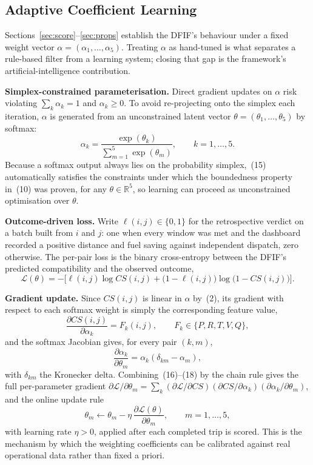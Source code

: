 \documentclass[conference]{IEEEtran}
\begin{document}
\subsection{Adaptive Coefficient Learning}
\label{sec:learn}
Sections~\ref{sec:score}--\ref{sec:props} establish the DFIF's behaviour
under a fixed weight vector $\alpha=(\alpha_1,\dots,\alpha_5)$. Treating
$\alpha$ as hand-tuned is what separates a rule-based filter from a learning
system; closing that gap is the framework's artificial-intelligence
contribution.

\textbf{Simplex-constrained parameterisation.} Direct gradient updates on
$\alpha$ risk violating $\sum_k\alpha_k=1$ and $\alpha_k\ge0$. To avoid
re-projecting onto the simplex each iteration, $\alpha$ is generated from an
unconstrained latent vector $\theta=(\theta_1,\dots,\theta_5)$ by softmax:
\begin{equation}
\alpha_k=\frac{\exp(\theta_k)}{\sum_{m=1}^{5}\exp(\theta_m)},
\qquad k=1,\dots,5.
\end{equation}
Because a softmax output always lies on the probability simplex,~(15)
automatically satisfies the constraints under which the boundedness property
in~(10) was proven, for any $\theta\in\mathbb{R}^5$, so learning can proceed
as unconstrained optimisation over $\theta$.

\textbf{Outcome-driven loss.} Write $\ell(i,j)\in\{0,1\}$ for the retrospective verdict on a batch built
from $i$ and $j$: one when every window was met and the dashboard recorded a
positive distance and fuel saving against independent dispatch, zero
otherwise. The per-pair loss is the binary cross-entropy between the DFIF's
predicted compatibility and the observed outcome,
\begin{equation}
\mathcal{L}(\theta)=-\bigl[\ell(i,j)\log CS(i,j)
 +\bigl(1-\ell(i,j)\bigr)\log\bigl(1-CS(i,j)\bigr)\bigr].
\end{equation}

\textbf{Gradient update.} Since $CS(i,j)$ is linear in $\alpha$ by~(2), its
gradient with respect to each softmax weight is simply the corresponding
feature value,
\begin{equation}
\frac{\partial CS(i,j)}{\partial\alpha_k}=F_k(i,j),
\qquad F_k\in\{P,R,T,V,Q\},
\end{equation}
and the softmax Jacobian gives, for every pair $(k,m)$,
\begin{equation}
\frac{\partial\alpha_k}{\partial\theta_m}=\alpha_k(\delta_{km}-\alpha_m),
\end{equation}
with $\delta_{km}$ the Kronecker delta. Combining~(16)--(18) by the chain rule
gives the full per-parameter gradient
$\partial\mathcal{L}/\partial\theta_m=
\sum_k(\partial\mathcal{L}/\partial CS)(\partial CS/\partial\alpha_k)
(\partial\alpha_k/\partial\theta_m)$, and the online update rule
\begin{equation}
\theta_m\leftarrow\theta_m-\eta\,
\frac{\partial\mathcal{L}(\theta)}{\partial\theta_m},\qquad m=1,\dots,5,
\end{equation}
with learning rate $\eta>0$, applied after each completed trip is scored.
This is the mechanism by which the weighting coefficients can be calibrated
against real operational data rather than fixed a priori.
\end{document}
